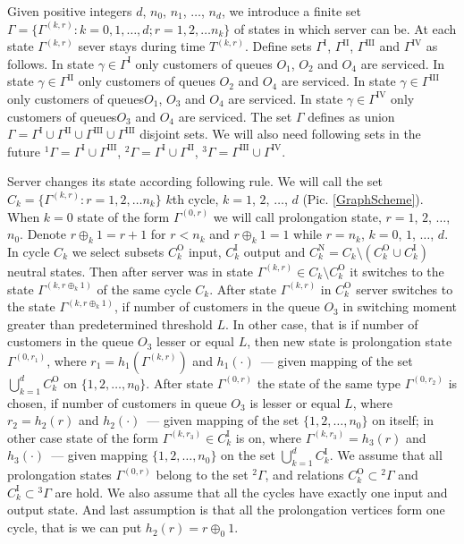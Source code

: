 \documentclass[10pt]{article}
\begin{document}
Given positive integers $d$, $n_0$, $n_1$, $\ldots$, $n_d$, we introduce a finite set $\Gamma=\{\Gamma^{(k,r)} \colon k=0,1,\ldots,d; r=1,2,\ldots n_k\}$ of states in which server can be. At each state $\Gamma^{(k,r)}$ sever stays during time $T^{(k,r)}$. Define sets $\Gamma^{\mathrm{I}}$, $\Gamma^{\mathrm{II}}$, $\Gamma^{\mathrm{III}}$ and $\Gamma^{\mathrm{IV}}$ as follows. 
In state $\gamma \in \Gamma^{\mathrm{I}}$ only customers of queues $O_1$, $O_2$ and $O_4$ are serviced.
In state $\gamma \in \Gamma^{\mathrm{II}}$ only customers of queues $O_2$ and $O_4$ are serviced.
In state $\gamma \in \Gamma^{\mathrm{III}}$ only customers of queues$O_1$, $O_3$ and $O_4$ are serviced.
In state $\gamma \in \Gamma^{\mathrm{IV}}$ only customers of queues$O_3$ and $O_4$ are serviced.
The set $\Gamma$ defines as union $\Gamma = \Gamma^{\mathrm{I}} \cup \Gamma^{\mathrm{II}} \cup \Gamma^{\mathrm{III}} \cup \Gamma^{\mathrm{III}}$ disjoint sets. We will also need following sets in the future ${}^1\Gamma=\Gamma^{\mathrm{I}} \cup \Gamma^{\mathrm{III}}$, 
${}^2\Gamma=\Gamma^{\mathrm{I}} \cup \Gamma^{\mathrm{II}}$,
${}^3\Gamma=\Gamma^{\mathrm{III}} \cup \Gamma^{\mathrm{IV}}$. 

Server changes its state according following rule. We will call the set $C_k = \{\Gamma^{(k,r)} \colon r=1,2,\ldots n_k\}$  $k$th cycle, $k=1$, $2$, $\ldots$, $d$ (Pic. \ref{GraphScheme}). When $k=0$ state of the form 
$\Gamma^{(0,r)}$ we will call prolongation state, $r=1$, $2$, $\ldots$, $n_0$. Denote $r \oplus_k 1 = r+1$ for $r<n_k$ and $r \oplus_k 1 = 1$ while $r=n_k$, $k = 0$, $1$, $\ldots$, $d$. In cycle $C_k$ we select subsets $C_k^{\mathrm{O}}$ input, $C_k^{\mathrm{I}}$ output and $C_k^{\mathrm{N}} = C_k \setminus (C_k^{\mathrm{O}} \cup C_k^{\mathrm{I}})$ neutral states. 
Then  after server was in state $\Gamma^{(k,r)} \in C_k\setminus C_k^{\mathrm{O}}$ it switches to the state $\Gamma^{(k,r \oplus_k 1)}$ of the same cycle $C_k$. 
After state $\Gamma^{(k,r)}$ in $C_k^{\mathrm{O}}$ server switches to the state $\Gamma^{(k,r \oplus_k 1)}$, if number of customers in the queue $O_3$ in switching moment greater than predetermined threshold $L$. In other case,  that is if number of customers in the queue $O_3$ lesser or equal $L$, then new state is prolongation state $\Gamma^{(0,r_1)}$, where 
$r_1=h_1(\Gamma^{(k,r)})$ and
$h_1(\cdot)$~--- given mapping of the set 
$\bigcup\limits_{k=1}^d C_k^{\mathrm{O}}$ on $\{1,2,\ldots, n_0\}$. 
After state $\Gamma^{(0,r)}$ the state of the same type $\Gamma^{(0,r_2)}$ is chosen, if number of customers in queue $O_3$ is lesser or equal $L$, where $r_2=h_2(r)$ and $h_2(\cdot)$~--- given mapping of the 
set $\{1,2, \ldots, n_0\}$ on itself; in other case state of the form $\Gamma^{(k,r_3)} \in C_k^{\mathrm{I}}$ is on, where $\Gamma^{(k,r_3)}=h_3(r)$ and $h_3(\cdot)$~--- given mapping $\{1,2, \ldots, n_0\}$ on the set  $\bigcup\limits_{k=1}^d C_k^{\mathrm{I}}$. We assume that all prolongation states $\Gamma^{(0,r)}$ belong to the set ${}^2 \Gamma$, and  relations $C_k^\mathrm{O}\subset {}^2 \Gamma$ and $C_k^\mathrm{I}\subset {}^3 \Gamma$ are hold. We also assume that all the cycles have exactly one input and output state. And last assumption is that all the prolongation vertices form one cycle, that is we can put $h_2(r)=r\oplus_0 1$.
\end{document}
